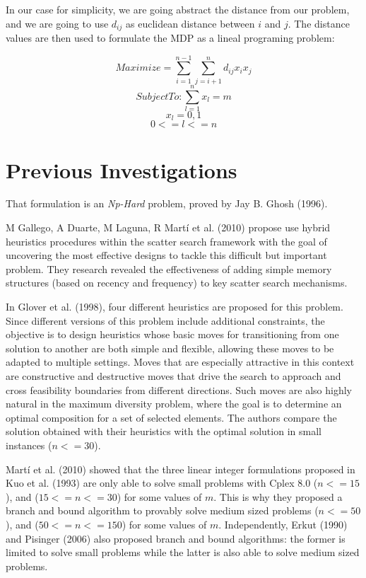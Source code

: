 \documentclass{ci5652}
\begin{document}
In our case for simplicity, we are going abstract the distance from our problem, and we are going to use {$d_{ij}$} as euclidean distance between {$i$} and {$j$}. The distance values are
then used to formulate the MDP as a lineal programing problem:

\[ Maximize  =  \sum_{i=1}^{n-1} \sum_{j=i+1}^{n} d_{ij}  x_{i}  x_{j} \]
\[ Subject To:     \sum_{l=1}^{n} x_{l} = m \]
\[  x_{l}  = 0,1  \]
\[ 0 <= l <= n \]

\section{Previous Investigations}

That formulation is an \textit{Np-Hard}  problem, proved by Jay B. Ghosh (1996).

M Gallego, A Duarte, M Laguna, R Martí et al. (2010) propose use hybrid heuristics procedures within the
scatter search framework with the goal of uncovering the most effective designs to tackle
this difficult but important problem. They research revealed the effectiveness of adding
simple memory structures (based on recency and frequency) to key scatter search
mechanisms. ~\cite{so2005}

In Glover et al. (1998), four different heuristics are proposed for this problem. Since different versions of this problem include additional constraints, the objective is to design heuristics whose basic moves for transitioning from one solution to another are both simple and flexible, allowing these moves to be adapted to multiple settings. Moves that are especially attractive in this context are constructive and destructive moves that drive the search to approach and cross feasibility boundaries from different directions. Such moves are also highly natural in the maximum diversity problem, where the goal is to determine an optimal composition for a set of selected elements. The authors compare the solution obtained with their heuristics with the optimal solution in small instances ({$n<=30$}).

Martí et al. (2010) showed that the three linear integer formulations proposed in Kuo et
al. (1993) are only able to solve small problems with Cplex 8.0 ({$n <= 15$}), and ({$15 <= n <= 30$})
for some values of {$m$}. This is why they proposed a branch and bound algorithm to
provably solve medium sized problems ({$n <= 50$}), and ({$50 <= n <= 150$}) for some values of {$m$}.
Independently, Erkut (1990) and Pisinger (2006) also proposed branch and bound
algorithms: the former is limited to solve small problems while the latter is also able to
solve medium sized problems.
\end{document}
